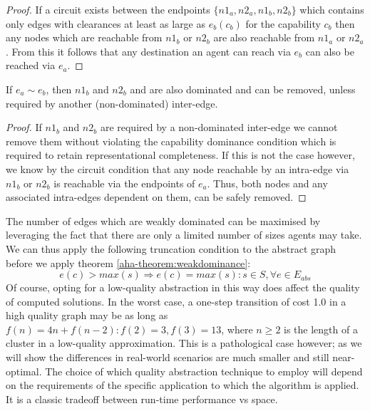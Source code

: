 \begin{proof}
If a circuit exists between the endpoints $\lbrace n1_{a}, n2_{a}, n1_{b}, n2_{b} \rbrace$ which contains only edges with clearances at least as large as $e_{b}(c_{b})$ for the capability $c_{b}$ then any nodes which are reachable from $n1_{b}$ or $n2_{b}$ are also reachable from $n1_{a}$ or $n2_{a}$.
From this it follows that any destination an agent can reach via $e_{b}$ can also be reached via $e_{a}$. 
\end{proof}
\begin{corollary}
If $e_{a} \sim e_{b}$, then $n1_{b}$ and $n2_{b}$ and are also dominated and can be removed, unless required by another (non-dominated) inter-edge. 
\end{corollary}
\begin{proof}
If $n1_{b}$ and $n2_{b}$ are required by a non-dominated inter-edge we cannot remove them without violating the capability dominance condition which is required to retain representational completeness. 
If this is not the case however, we know by the circuit condition that any node reachable by an intra-edge via $n1_{b}$ or $n2_{b}$ is reachable via the endpoints of $e_{a}$. 
Thus, both nodes and any associated intra-edges dependent on them, can be safely removed.
\end{proof}
The number of edges which are weakly dominated can be maximised by leveraging the fact that there are only a limited number of sizes agents may take. 
We can thus apply the following truncation condition to the abstract graph before we apply theorem \ref{aha-theorem:weakdominance}:
$$
e(c) > max(s) \Rightarrow e(c) = max(s) : s \in S, \forall e \in E_{abs}
$$
Of course, opting for a low-quality abstraction in this way does affect the quality of computed solutions. 
In the worst case, a one-step transition of cost 1.0 in a high quality graph may be as long as $f(n) = 4n + f(n-2) : f(2) = 3, f(3) = 13$, where $n \geq 2$ is the length of a cluster in a low-quality approximation.
This is a pathological case however; as we will show the differences in real-world scenarios are much smaller and still near-optimal. 
The choice of which quality abstraction technique to employ will depend on the requirements of the specific application to which the algorithm is applied.
It is a classic tradeoff between run-time performance vs space.
